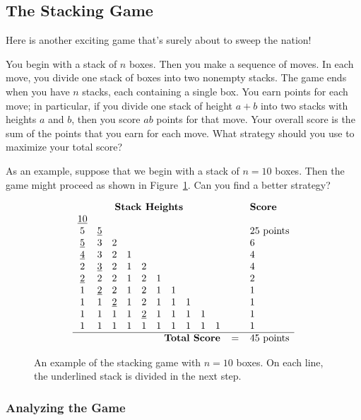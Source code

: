 \subsection{The Stacking Game}\label{block-stack-subsection}

Here is another exciting game that's surely about to sweep the
nation!

You begin with a stack of $n$ boxes.  Then you
make a sequence of moves.  In each move, you divide one stack of boxes
into two nonempty stacks.  The game ends when you have $n$ stacks, each
containing a single box.  You earn points for each move; in particular, if
you divide one stack of height $a + b$ into two stacks with heights $a$
and $b$, then you score $ab$ points for that move.  Your overall score is
the sum of the points that you earn for each move.  What strategy should
you use to maximize your total score?

As an example, suppose that we begin with a stack of $n = 10$ boxes.
Then the game might proceed as shown in Figure~\ref{fig:stacking-10}.
Can you find a better strategy?
%
\begin{figure}\redrawntrue
\[
\begin{array}{cccccccccccl}
\multicolumn{10}{c}{\textbf{Stack Heights}} & \quad & \textbf{Score} \\
\underline{10}&&&&&&&&& && \\
5&\underline{5}&&&&&&&& && 25 \text{ points} \\
\underline{5}&3&2&&&&&&& && 6 \\
\underline{4}&3&2&1&&&&&& && 4 \\
2&\underline{3}&2&1&2&&&&& && 4 \\
\underline{2}&2&2&1&2&1&&&& && 2 \\
1&\underline{2}&2&1&2&1&1&&& && 1 \\
1&1&\underline{2}&1&2&1&1&1&& && 1 \\
1&1&1&1&\underline{2}&1&1&1&1& && 1 \\
1&1&1&1&1&1&1&1&1&1 && 1 \\ \hline
\multicolumn{10}{r}{\textbf{Total Score}} & = & 45 \text{ points}
\end{array}
\]
\caption{An example of the stacking game with $n = 10$ boxes.  On each
line, the underlined stack is divided in the next step.}
\label{fig:stacking-10}
\end{figure}

\subsubsection{Analyzing the Game}

